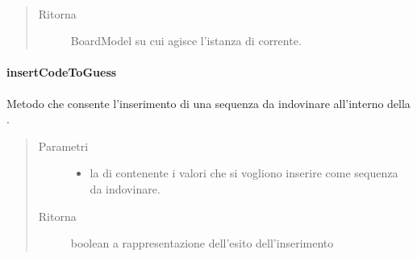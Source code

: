 \documentclass[letterpaper,10pt,italian,openany,oneside]{sphinxmanual}
\begin{document}
\begin{fulllineitems}
\label{\detokenize{source/it/unicam/cs/pa/mastermind/gamecore/BoardController:it.unicam.cs.pa.mastermind.gamecore.BoardController.getBoardReference()}}~\begin{quote}\begin{description}
\item[{Ritorna}] \leavevmode
BoardModel su cui agisce l’istanza di  corrente.

\end{description}\end{quote}

\end{fulllineitems}



\paragraph{insertCodeToGuess}
\label{\detokenize{source/it/unicam/cs/pa/mastermind/gamecore/BoardController:insertcodetoguess}}

\begin{fulllineitems}
\label{\detokenize{source/it/unicam/cs/pa/mastermind/gamecore/BoardController:it.unicam.cs.pa.mastermind.gamecore.BoardController.insertCodeToGuess(List)}}
Metodo che consente l’inserimento di una sequenza da indovinare all’interno della .
\begin{quote}\begin{description}
\item[{Parametri}] \leavevmode\begin{itemize}
\item {} 
 \textendash{} la  di  contenente i valori che si vogliono inserire come sequenza da indovinare.

\end{itemize}

\item[{Ritorna}] \leavevmode
boolean a rappresentazione dell’esito dell’inserimento

\end{description}\end{quote}

\end{fulllineitems}
\end{document}
